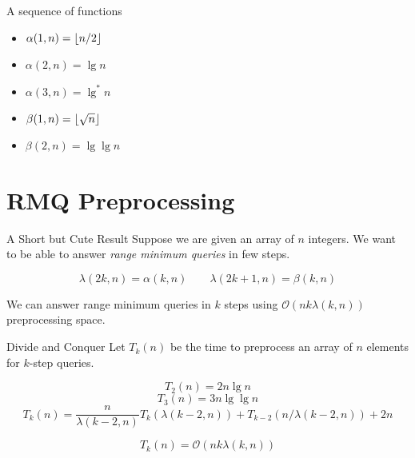 \documentclass[aspectratio=169]{beamer}
\begin{document}
\begin{frame}{A sequence of functions}
	\pause
	\begin{minipage}{0.48\linewidth}
		\onslide<+->
		\begin{itemize}
			\item $ \alpha(1, n) = \left\lfloor n / 2 \right\rfloor $
			      \onslide<+->
			\item $ \alpha(2, n) = \lg n $
			      \onslide<+->
			\item $ \alpha(3, n) = \lg^* n $
		\end{itemize}
	\end{minipage}
	\begin{minipage}{0.48\linewidth}
		\onslide<+->
		\begin{itemize}
			\item $ \beta(1, n) = \left\lfloor \sqrt n \right\rfloor $
			      \onslide<+->
			\item $ \beta(2, n) = \lg \lg n $
		\end{itemize}
	\end{minipage}
\end{frame}

\section{RMQ Preprocessing}
\frame{\sectionpage}

\begin{frame}{A Short but Cute Result}
	Suppose we are given an array of $n$ integers.
	We want to be able to answer \emph{range minimum queries} in few steps.

	\pause
	\begin{eqn}
		$$
			\lambda(2k, n) = \alpha(k, n) \qquad
			\lambda(2k + 1, n) = \beta(k, n)
		$$
	\end{eqn}
	\pause
	\begin{thrm}[Alon '87]
		We can answer range minimum queries in $k$ steps using $\mathcal{O}(nk \lambda(k, n))$ preprocessing space.
	\end{thrm}

\end{frame}

\begin{frame}{Divide and Conquer}
	Let $T_k(n)$ be the time to preprocess an array of $n$ elements for $k$-step queries.
	\pause
	\begin{eqn}
		$$
			T_2(n) = 2n \lg n
		$$
		$$
			T_3(n) = 3n \lg \lg n
		$$
		$$
			T_k(n) = \dfrac{n}{\lambda(k - 2, n)} T_k(\lambda(k - 2, n)) + T_{k-2}(n / \lambda(k - 2, n)) + 2n
		$$
	\end{eqn}
	\pause
	\begin{eqn}
		$$
			T_k(n) = \mathcal{O}(nk \lambda(k, n))
		$$
	\end{eqn}
\end{frame}
\end{document}
